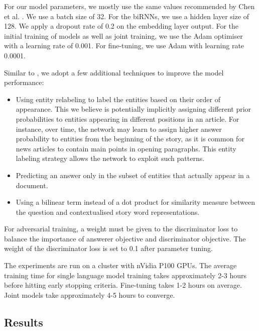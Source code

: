 \documentclass[]{article}
\begin{document}
For our model parameters, we mostly use the same values recommended by Chen et al. \cite{chen2016thorough}. We use a batch size of 32. For the biRNNs, we use a hidden layer size of 128. We apply a dropout rate of 0.2 on the embedding layer output. For the initial training of models as well as joint training, we use the Adam optimiser \cite{kingma2014adam} with a learning rate of 0.001. For fine-tuning, we use Adam with learning rate 0.0001. 

Similar to \cite{chen2016thorough}, we adopt a few additional techniques to improve the model performance: 
\begin{itemize}
	\item Using entity relabeling to label the entities based on their order of appearance. This we believe is potentially implicitly assigning different prior probabilities to entities appearing in different positions in an article. For instance, over time, the network may learn to assign higher answer probability to entities from the beginning of the story, as it is common for news articles to contain main points in opening paragraphs. This entity labeling strategy allows the network to exploit such patterns.
	\item Predicting an answer only in the subset of entities that actually appear in a document.
	\item Using a bilinear term instead of a dot product for similarity measure between the question and contextualised story word representations.
\end{itemize}

For adversarial training, a weight must be given to the discriminator loss to balance the importance of answerer objective and discriminator objective. The weight of the discriminator loss is set to 0.1 after parameter tuning.

The experiments are run on a cluster with nVidia P100 GPUs. The average training time for single language model training takes approximately 2-3 hours before hitting early stopping criteria. Fine-tuning takes 1-2 hours on average. Joint models take approximately 4-5 hours to converge.

\subsection{Results}
\end{document}
